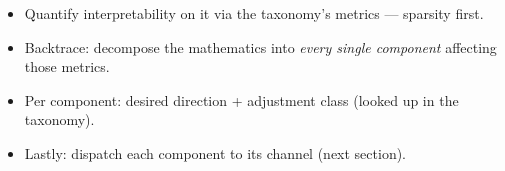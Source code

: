 \begin{itemize}
    \item Quantify interpretability on it via the taxonomy's metrics — sparsity first.
    \item Backtrace: decompose the mathematics into \emph{every single component} affecting those metrics.
    \item Per component: desired direction + adjustment class (looked up in the taxonomy).
    \item Lastly: dispatch each component to its channel (next section).
\end{itemize}

